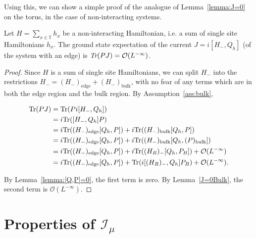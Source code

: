 \documentclass[12pt, letterpaper]{article}
\begin{document}
Using this, we can show a simple proof of the analogue of Lemma~\ref{lemma:J=0} on the torus, in the case of non-interacting systems.

\begin{proposition}
Let $H = \sum_{x \in \mathbb{T}} h_x$ be a non-interacting Hamiltonian, i.e. a sum of single site Hamiltonians $h_x$. The ground state expectation of the current $J=i[H_-, Q_h]$ (of the system with an edge) is $\emph{Tr}(PJ)=\mathcal{O}(L^{-\infty})$.
\label{prop:J=0Torus}
\end{proposition}

\begin{proof}

Since $H$ is a sum of single site Hamiltonians, we can split $H_-$ into the restrictions $H_- = (H_-)_\text{edge} + (H_-)_\text{bulk}$, with no fear of any terms which are in both the edge region and the bulk region. By Assumption~\ref{ass:bulk},

\[\begin{aligned}
\text{Tr}(PJ) &= \text{Tr}(Pi[H_-, Q_h])\\
&= i\text{Tr}([H_-, Q_h]P)\\
&= i\text{Tr}((H_-)_\text{edge} [Q_h, P]) + i \text{Tr}((H_-)_\text{bulk} [Q_h, P])\\
&= i\text{Tr}((H_-)_\text{edge} [Q_h, P]) + i \text{Tr}((H_-)_\text{bulk} [Q_h, (P)_\text{bulk}])\\
&= i\text{Tr}((H_-)_\text{edge} [Q_h, P]) + i \text{Tr}((H_B)_-[Q_h, P_B]) + \mathcal{O}(L^{-\infty})\\
&= i\text{Tr}((H_-)_\text{edge} [Q_h, P]) + \text{Tr}(i[(H_B)_-, Q_h]P_B) + \mathcal{O}(L^{-\infty}).
\end{aligned}\]

By Lemma~\ref{lemma:[Q,P]=0}, the first term is zero. By Lemma~\ref{J=0Bulk}, the second term is $\mathcal{O}(L^{-\infty})$. 
\end{proof}

\newpage
\appendix

\section{Properties of $\mathcal{I}_\mu$}
\end{document}

